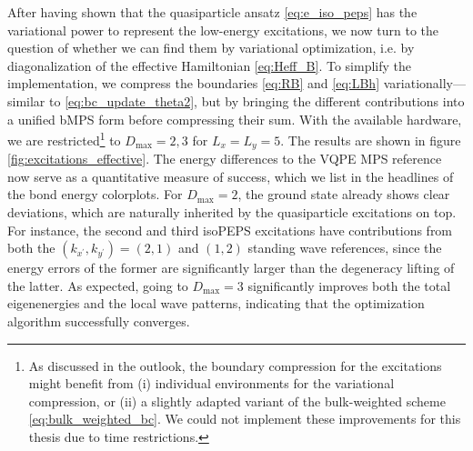 \noindent After having shown that the quasiparticle ansatz \eqref{eq:e_iso_peps} has the variational power to represent the low-energy excitations, we now turn to the question of whether we can find them by variational optimization, i.e. by diagonalization of the effective Hamiltonian \eqref{eq:Heff_B}. To simplify the implementation, we compress the boundaries \eqref{eq:RB} and \eqref{eq:LBh} variationally---similar to \eqref{eq:bc_update_theta2}, but by bringing the different contributions into a unified bMPS form before compressing their sum. With the available hardware, we are restricted\footnote{As discussed in the outlook, the boundary compression for the excitations might benefit from (i) individual environments for the variational compression, or (ii) a slightly adapted variant of the bulk-weighted scheme \eqref{eq:bulk_weighted_bc}. We could not implement these improvements for this thesis due to time restrictions.} to $D_{\text{max}} = 2, 3$ for $L_x = L_y = 5$. The results are shown in figure \ref{fig:excitations_effective}. The energy differences to the VQPE MPS reference now serve as a quantitative measure of success, which we list in the headlines of the bond energy colorplots. For $D_{\text{max}} = 2$, the ground state already shows clear deviations, which are naturally inherited by the quasiparticle excitations on top. For instance, the second and third isoPEPS excitations have contributions from both the $(k_{x^{\prime}}, k_{y^{\prime}}) = (2, 1)$ and $(1, 2)$ standing wave references, since the energy errors of the former are significantly larger than the degeneracy lifting of the latter. As expected, going to $D_{\text{max}} = 3$ significantly improves both the total eigenenergies and the local wave patterns, indicating that the optimization algorithm successfully converges.

